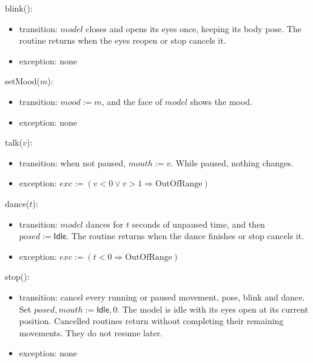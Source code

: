 \documentclass[10pt, titlepage]{article}
\newcommand{\T}[1]{\mathit{#1}}          %
\newcommand{\V}[1]{\mathsf{#1}}          %
\newcommand{\exc}{\mathit{exc}}
\begin{document}
\begin{samepage}
\noindent blink():
\begin{itemize}
\item transition: $\T{model}$ closes and opens its eyes once, keeping its
  body pose. The routine returns when the eyes reopen or stop cancels it.
\item exception: none
\end{itemize}
\end{samepage}
\par\pagebreak[0]

\begin{samepage}
\noindent setMood($m$):
\begin{itemize}
\item transition: $\T{mood} := m$, and the face of $\T{model}$ shows the mood.
\item exception: none
\end{itemize}
\end{samepage}
\par\pagebreak[0]

\begin{samepage}
\noindent talk($v$):
\begin{itemize}
\item transition: when not paused, $\T{mouth} := v$. While paused,
  nothing changes.
\item exception: $\exc := (v < 0 \vee v > 1 \Rightarrow \text{OutOfRange})$
\end{itemize}
\end{samepage}
\par\pagebreak[0]

\begin{samepage}
\noindent dance($t$):
\begin{itemize}
\item transition: $\T{model}$ dances for $t$ seconds of unpaused time,
  and then $\T{posed} := \V{Idle}$. The routine returns when the dance
  finishes or stop cancels it.
\item exception: $\exc := (t < 0 \Rightarrow \text{OutOfRange})$
\end{itemize}
\end{samepage}
\par\pagebreak[0]

\begin{samepage}
\noindent stop():
\begin{itemize}
\item transition: cancel every running or paused movement, pose, blink and
  dance. Set $\T{posed}, \T{mouth} := \V{Idle}, 0$. The model is idle with
  its eyes open at its current position. Cancelled routines return without
  completing their remaining movements. They do not resume later.
\item exception: none
\end{itemize}
\end{samepage}
\par\pagebreak[0]
\end{document}
